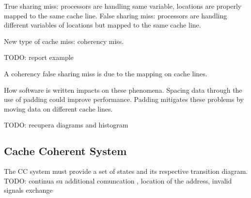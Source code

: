 True sharing miss: processors are handling same variable, locations are properly mapped to the same cache line.
False sharing miss: processors are handling different variables of locations but mapped to the same cache line.

New type of cache miss: coherency miss.

TODO: report example

A coherency false sharing miss is due to the mapping on cache lines.

How software is written impacts on these phenomena. Spacing data through the use of padding could improve performance. Padding mitigates these problems by moving data on different cache lines.

TODO: recupera diagrams and histogram

\subsection{Cache Coherent System}
The CC system must provide a set of states and its respective transition diagram. TODO: continua su additional comuncation , location of the address, invalid signals exchange